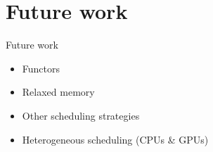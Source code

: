 \section{Future work}

\begin{frame}{Future work}
\Large
\begin{itemize}
  \setlength\itemsep{1em}
  \item Functors
  \item Relaxed memory
  \item Other scheduling strategies
  \item Heterogeneous scheduling (CPUs \& GPUs)
\end{itemize}
\end{frame}
